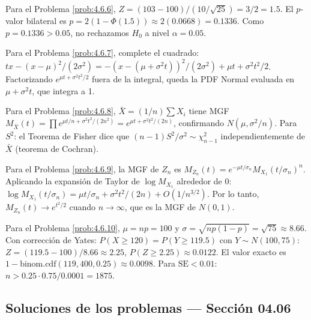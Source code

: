 \begin{sugerencia}
	\label{sug:4.6.6}
	Para el Problema \ref{prob:4.6.6}, $Z = (103 - 100)/(10/\sqrt{25}) = 3/2 = 1.5$. El $p$-valor bilateral es $p = 2(1 - \Phi(1.5)) \approx 2(0.0668) = 0.1336$. Como $p = 0.1336 > 0.05$, no rechazamos $H_{0}$ a nivel $\alpha = 0.05$.
\end{sugerencia}

\begin{sugerencia}
	\label{sug:4.6.7}
	Para el Problema \ref{prob:4.6.7}, complete el cuadrado: $tx - (x-\mu)^{2}/(2\sigma^{2}) = -(x - (\mu + \sigma^{2}t))^{2}/(2\sigma^{2}) + \mu t + \sigma^{2}t^{2}/2$. Factorizando $e^{\mu t + \sigma^{2}t^{2}/2}$ fuera de la integral, queda la PDF Normal evaluada en $\mu + \sigma^{2}t$, que integra a 1.
\end{sugerencia}

\begin{sugerencia}
	\label{sug:4.6.8}
	Para el Problema \ref{prob:4.6.8}, $\bar{X} = (1/n) \sum X_{i}$ tiene MGF $M_{\bar{X}}(t) = \prod e^{\mu t/n + \sigma^{2}t^{2}/(2n^{2})} = e^{\mu t + \sigma^{2}t^{2}/(2n)}$, confirmando $N(\mu, \sigma^{2}/n)$. Para $S^{2}$: el Teorema de Fisher dice que $(n-1)S^{2}/\sigma^{2} \sim \chi^{2}_{n-1}$ independientemente de $\bar{X}$ (teorema de Cochran).
\end{sugerencia}

\begin{sugerencia}
	\label{sug:4.6.9}
	Para el Problema \ref{prob:4.6.9}, la MGF de $Z_{n}$ es $M_{Z_n}(t) = e^{-\mu t/\sigma_n} M_{X_{1}}(t/\sigma_n)^{n}$. Aplicando la expansión de Taylor de $\log M_{X_{1}}$ alrededor de 0: $\log M_{X_{1}}(t/\sigma_n) = \mu t/\sigma_n + \sigma^{2}t^{2}/(2n) + O(1/n^{3/2})$. Por lo tanto, $M_{Z_{n}}(t) \to e^{t^{2}/2}$ cuando $n \to \infty$, que es la MGF de $N(0, 1)$.
\end{sugerencia}

\begin{sugerencia}
	\label{sug:4.6.10}
	Para el Problema \ref{prob:4.6.10}, $\mu = np = 100$ y $\sigma = \sqrt{np(1-p)} = \sqrt{75} \approx 8.66$. Con corrección de Yates: $P(X \ge 120) = P(Y \ge 119.5)$ con $Y \sim N(100, 75)$: $Z = (119.5 - 100)/8.66 \approx 2.25$, $P(Z \ge 2.25) \approx 0.0122$. El valor exacto es $1 - \text{binom.cdf}(119, 400, 0.25) \approx 0.0098$. Para $\text{SE} < 0.01$: $n > 0.25 \cdot 0.75/0.0001 = 1875$.
\end{sugerencia}

\subsection*{Soluciones de los problemas --- Sección 04.06}

